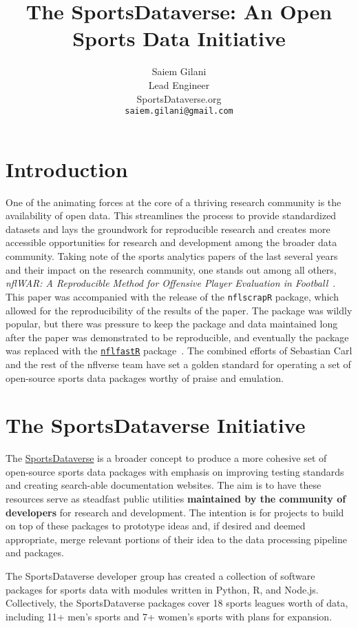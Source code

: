 \documentclass[12pt]{article}
\title{The SportsDataverse: An Open Sports Data Initiative}
\author{
 Saiem Gilani \\
  Lead Engineer\\
  SportsDataverse.org\\
  \texttt{saiem.gilani@gmail.com} \\
}
\begin{document}
 \maketitle

\section{Introduction}
One of the animating forces at the core of a thriving research community is the availability of open data. This streamlines the process to provide standardized datasets and lays the groundwork for reproducible research and creates more accessible opportunities for research and development among the broader data community.  Taking note of the sports analytics papers of the last several years and their impact on the research community, one stands out among all others, \emph{nflWAR: A Reproducible Method for Offensive Player Evaluation in Football}~\cite{yurko_ventura_horowitz_2019}. This paper was accompanied with the release of the \texttt{nflscrapR} package, which allowed for the reproducibility of the results of the paper. The package was wildly popular, but there was pressure to keep the package and data maintained long after the paper was demonstrated to be reproducible, and eventually the package was replaced with the \href{https://www.nflfastR.com}{\texttt{nflfastR}} package~\cite{carl_baldwin_2020}. The combined efforts of Sebastian Carl and the rest of the nflverse team have set a golden standard for operating a set of open-source sports data packages worthy of praise and emulation. 

\section{The SportsDataverse Initiative}
The \href{https://sportsdataverse.org}{SportsDataverse} is a broader concept to produce a more cohesive set of open-source sports data packages with emphasis on improving testing standards and creating search-able documentation websites. The aim is to have these resources serve as steadfast public utilities \textbf{maintained by the community of developers} for research and development. The intention is for projects to build on top of these packages to prototype ideas and, if desired and deemed appropriate, merge relevant portions of their idea to the data processing pipeline and packages.

The SportsDataverse developer group has created a collection of software packages for sports data with modules written in Python, R, and Node.js. Collectively, the SportsDataverse packages cover 18 sports leagues worth of data, including 11+ men's sports and 7+ women's sports with plans for expansion. 
\end{document}
